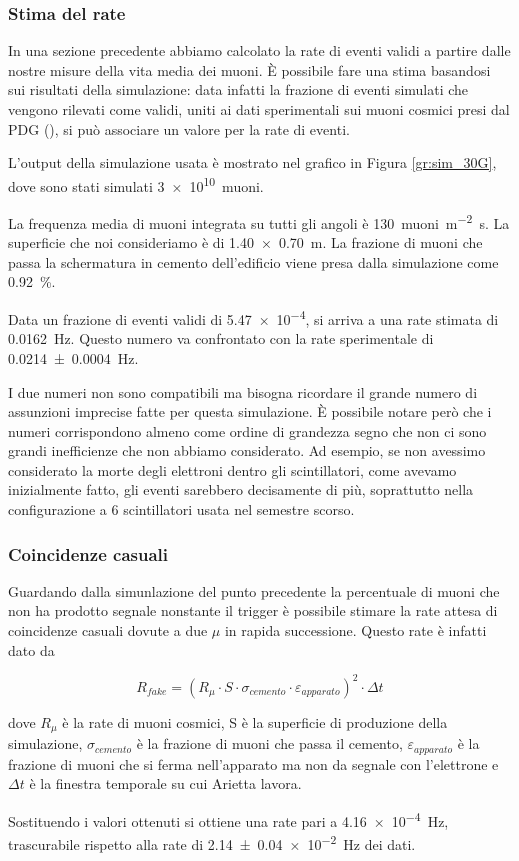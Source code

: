 \subsubsection{Stima del rate}
In una sezione precedente abbiamo calcolato la rate di eventi validi a partire dalle nostre misure della vita media dei muoni. 
\`E possibile fare una stima basandosi sui risultati della simulazione: data infatti la frazione di eventi simulati che vengono rilevati come validi, uniti ai dati sperimentali sui muoni cosmici presi dal PDG (\cite{bib:Patrignani:2016xqp}), si pu\`o associare un valore per la rate di eventi.

L'output della simulazione usata \`e mostrato nel grafico in Figura \ref{gr:sim_30G}, dove sono stati simulati \SI{3e10}{muoni}.

La frequenza media di muoni integrata su tutti gli angoli \`e \SI{130}{muoni\per\square\metre\second}. La superficie che noi consideriamo \`e di \SI{1.40 x 0.70}{\m}. 
La frazione di muoni che passa la schermatura in cemento dell'edificio viene presa dalla simulazione come \SI{0.92}{\percent}.

Data un frazione di eventi validi di \num{5.47e-4}, si arriva a una rate stimata di \SI{0.0162}{\Hz}. 
Questo numero va confrontato con la rate sperimentale di \SI{0.0214 +- 0.0004}{\Hz}.

I due numeri non sono compatibili ma bisogna ricordare il grande numero di assunzioni imprecise fatte per questa simulazione. 
\`E possibile notare per\`o che i numeri corrispondono almeno come ordine di grandezza segno che non ci sono grandi inefficienze che non abbiamo considerato. 
Ad esempio, se non avessimo considerato la morte degli elettroni dentro gli scintillatori, come avevamo inizialmente fatto, gli eventi sarebbero decisamente di pi\`u, soprattutto nella configurazione a 6 scintillatori usata nel semestre scorso.

\subsubsection{Coincidenze casuali}
Guardando dalla simunlazione del punto precedente la percentuale di muoni che non ha prodotto segnale nonstante il trigger \`e possibile stimare la rate attesa di coincidenze casuali dovute a due $\mu$ in rapida successione.
Questo rate \`e infatti dato da

\begin{equation}
	R_{fake} = \left(R_\mu\cdot S\cdot\sigma_{cemento}\cdot\varepsilon_{apparato}\right)^2\cdot\Delta t
	\label{eq:fakes}
\end{equation}

dove $R_\mu$ \`e la rate di muoni cosmici, S \`e la superficie di produzione della simulazione, $\sigma_{cemento}$ \`e la frazione di muoni che passa il cemento, $\varepsilon_{apparato}$ \`e la frazione di muoni che si ferma nell'apparato ma non da segnale con l'elettrone e $\Delta t$ \`e la finestra temporale su cui Arietta lavora.

Sostituendo i valori ottenuti si ottiene una rate pari a \SI{4.16e-4}{\Hz}, trascurabile rispetto alla rate di \SI{2.14 +- 0.04e-2}{\Hz} dei dati.
